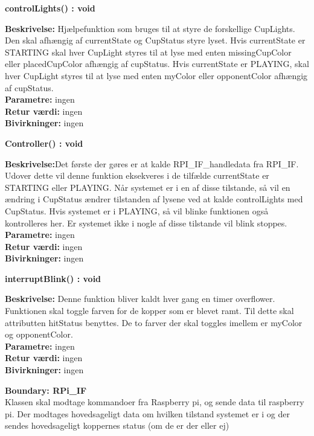 \documentclass[Arkitektur/System_main.tex]{subfiles}
\begin{document}
\textbf{controlLights() : void}
\begin{adjustwidth}{1cm}{0pt}
\textbf{Beskrivelse:} Hjælpefunktion som bruges til at styre de forskellige CupLights. Den skal afhængig af currentState og CupStatus styre lyset. Hvis currentState er STARTING skal hver CupLight styres til at lyse med enten missingCupColor eller placedCupColor afhængig af cupStatus. Hvis currentState er PLAYING, skal hver CupLight styres til at lyse med enten myColor eller opponentColor afhængig af cupStatus.  \\[0.2cm]
\textbf{Parametre:} ingen\\[0.2cm]
\textbf{Retur værdi:} ingen\\[0.2cm]
\textbf{Bivirkninger:} ingen\\[0.2cm]
\end{adjustwidth}

\textbf{Controller() : void}
\begin{adjustwidth}{1cm}{0pt}
\textbf{Beskrivelse:}Det første der gøres er at kalde RPI\_IF\_handledata fra RPI\_IF. Udover dette vil denne funktion eksekveres i de tilfælde currentState er STARTING eller PLAYING. Når systemet er i en af disse tilstande, så vil en ændring i CupStatus ændrer tilstanden af lysene ved at kalde controlLights med CupStatus. Hvis systemet er i PLAYING, så vil blinke funktionen også kontrolleres her. Er systemet ikke i nogle af disse tilstande vil blink stoppes.
\\[0.2cm]
\textbf{Parametre:} ingen\\[0.2cm]
\textbf{Retur værdi:} ingen\\[0.2cm]
\textbf{Bivirkninger:} ingen\\[0.2cm]
\end{adjustwidth}

\textbf{interruptBlink() : void}
\begin{adjustwidth}{1cm}{0pt}
\textbf{Beskrivelse:} Denne funktion bliver kaldt hver gang en timer overflower. Funktionen skal toggle farven for de kopper som er blevet ramt. Til dette skal attributten hitStatus benyttes. De to farver der skal toggles imellem er myColor og opponentColor.
\\[0.2cm]
\textbf{Parametre:} ingen\\[0.2cm]
\textbf{Retur værdi:} ingen\\[0.2cm]
\textbf{Bivirkninger:} ingen\\[0.2cm]
\end{adjustwidth}

{\large\textbf{Boundary:  RPi\_IF}}\\
Klassen skal modtage kommandoer fra Raspberry pi, og sende data til raspberry pi. Der modtages hovedsageligt data om hvilken tilstand systemet er i og der sendes hovedsageligt koppernes status (om de er der eller ej)
\end{document}
